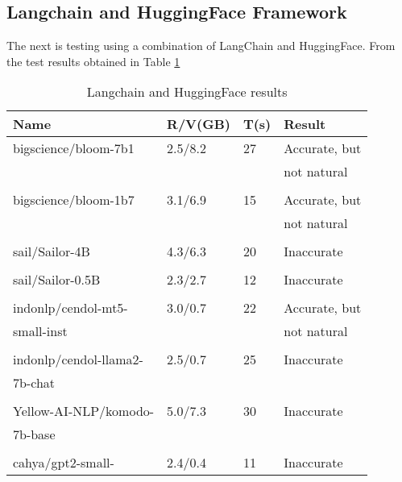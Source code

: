 \subsection{Langchain and HuggingFace Framework }
The next is testing using a combination of LangChain and HuggingFace. From the test results obtained in Table  \ref{tab:hasilrag}
\begin{table}[!htbp]
  \caption{Langchain and HuggingFace results}
  \label{tab:hasilrag}
  \centering
  \begin{tabular}{llll}
    \toprule
    Name                      & R/V(GB) & T(s)  & Result \\
    \midrule
    bigscience/bloom-7b1      & 2.5/8.2    &27   & Accurate, but \\ \cite{muennighoff2022crosslingual}                          &          &           & not natural \\  
    \\
    bigscience/bloom-1b7
    \cite{muennighoff2022crosslingual}      & 3.1/6.9   &15    & Accurate, but \\
                              &          &           & not natural \\ 
    \\ 
    sail/Sailor-4B \cite{dou2024sailor}           & 4.3/6.3    &20   & Inaccurate \\
    \\
    sail/Sailor-0.5B \cite{dou2024sailor}          & 2.3/2.7   &12    & Inaccurate \\
    \\
    indonlp/cendol-mt5-       & 3.0/0.7  &22     & Accurate, but \\
    small-inst \cite{indonlp1,indonlp2, indonlp3, indonlp4, indonlp5, indonlp6, indonlp7}              &          &           & not natural \\ 
    \\
    indonlp/cendol-llama2-    & 2.5/0.7   &25      & Inaccurate \\
    7b-chat \cite{indonlp1,indonlp2, indonlp3, indonlp4, indonlp5, indonlp6, indonlp7}                  &          &           &  \\
    \\
    Yellow-AI-NLP/komodo-     & 5.0/7.3   &30    & Inaccurate \\
    7b-base \cite{owen2024komodo}                  &          &           &  \\
    \\
    cahya/gpt2-small-         & 2.4/0.4   &11    & Inaccurate \\

\end{tabular}
\end{table}
